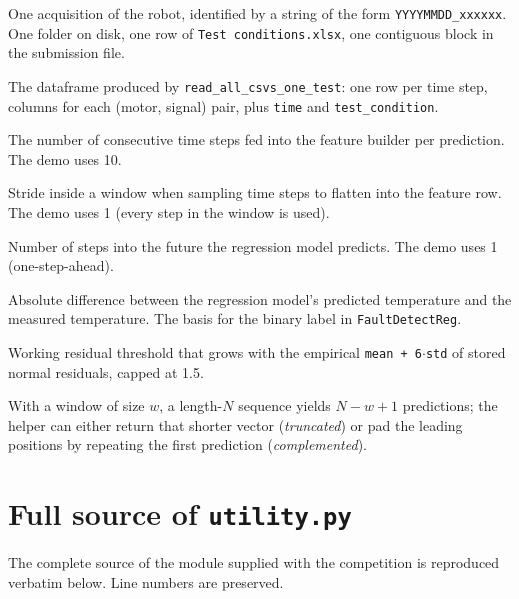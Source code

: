 \documentclass[11pt,a4paper]{article}
\begin{document}
\begin{description}[leftmargin=1.6em,style=nextline]
  \item[Sequence / test condition]
    One acquisition of the robot, identified by a string of the form
    \texttt{YYYYMMDD\_xxxxxx}. One folder on disk, one row of
    \texttt{Test conditions.xlsx}, one contiguous block in the submission file.
  \item[Wide frame]
    The dataframe produced by \texttt{read\_all\_csvs\_one\_test}: one row per
    time step, columns for each (motor, signal) pair, plus \texttt{time} and
    \texttt{test\_condition}.
  \item[Window size]
    The number of consecutive time steps fed into the feature builder per
    prediction. The demo uses 10.
  \item[Sample step]
    Stride inside a window when sampling time steps to flatten into the
    feature row. The demo uses 1 (every step in the window is used).
  \item[Prediction lead time]
    Number of steps into the future the regression model predicts. The demo
    uses 1 (one-step-ahead).
  \item[Residual error]
    Absolute difference between the regression model's predicted temperature
    and the measured temperature. The basis for the binary label in
    \texttt{FaultDetectReg}.
  \item[Adaptive threshold]
    Working residual threshold that grows with the empirical
    \texttt{mean + 6$\cdot$std} of stored normal residuals, capped at 1.5.
  \item[Truncation versus padding]
    With a window of size $w$, a length-$N$ sequence yields $N - w + 1$
    predictions; the helper can either return that shorter vector
    (\emph{truncated}) or pad the leading positions by repeating the first
    prediction (\emph{complemented}).
\end{description}

\section{Full source of \texttt{utility.py}}
\label{sec:appendix-utility}

The complete source of the module supplied with the competition is reproduced
verbatim below. Line numbers are preserved.
\end{document}

